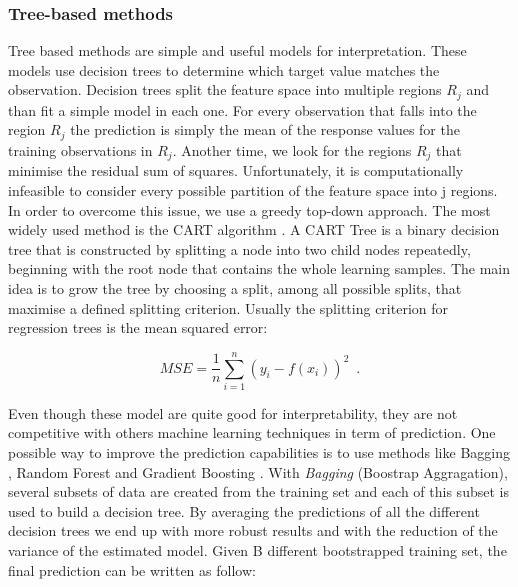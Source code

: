 \subsubsection{Tree-based methods} \label{Tree-based methods}

Tree based methods are simple and useful models for interpretation. These models use decision trees to determine which target value matches the observation. Decision trees split the feature space into multiple regions $R_j$ and than fit a simple model in each one. For every observation that falls into the region $R_j$ the prediction is simply the mean of the response values for the training observations in $R_j$. Another time, we look for the regions $R_j$ that minimise the residual sum of squares. Unfortunately, it is computationally infeasible to consider every possible partition of the feature space into j regions. In order to overcome this issue, we use a greedy top-down approach. The most widely used method is the CART algorithm \citep{breiman2017classification}. A CART Tree is a binary decision tree that is constructed by splitting a node into two child nodes repeatedly, beginning with the root node that contains the whole learning samples. The main idea is to grow the tree by choosing a split, among all possible splits, that maximise a defined splitting criterion. Usually the splitting criterion for regression trees is the mean squared error:

\begin{equation}
    MSE = \frac{1}{n}\sum_{i=1}^{n}(y_i -f(x_i))^2
    \enspace.
\end{equation}

Even though these model are quite good for interpretability, they are not competitive with others machine learning techniques in term of prediction. One possible way to improve the prediction capabilities is to use methods like Bagging \citep{breiman1996bagging}, Random Forest \citep{breiman2001random} and Gradient Boosting \citep{friedman2001greedy}.
With \textit{Bagging} (Boostrap Aggragation), several subsets of data are created from the training set and each of this subset is used to build a decision tree. By averaging the predictions of all the different decision trees we end up with more robust results and with the reduction of the variance of the estimated model. Given B different bootstrapped training set, the final prediction can be written as follow:

